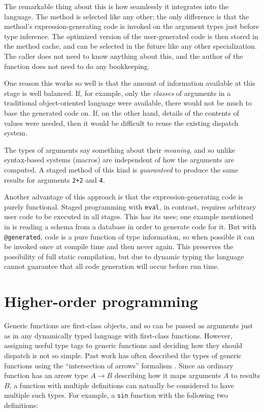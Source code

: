 The remarkable thing about this is how seamlessly it integrates into
the language.
The method is selected like any other; the only difference is that
the method's expression-generating code is invoked on the argument types
just before type inference.
The optimized version of the user-generated code is then stored in the method
cache, and can be selected in the future like any other specialization.
The caller does not need to know anything about this, and the author
of the function does not need to do any bookkeeping.

One reason this works so well is that the amount of information
available at this stage is well balanced.
If, for example, only the \emph{classes} of arguments in a traditional
object-oriented language were available, there would not be much
to base the generated code on.
If, on the other hand, details of the contents of values were needed,
then it would be difficult to reuse the existing dispatch system.

The types of arguments say something about their \emph{meaning},
and so unlike syntax-based systems (macros) are independent of how
the arguments are computed.
A staged method of this kind is \emph{guaranteed} to produce the
same results for arguments \texttt{2+2} and \texttt{4}.

Another advantage of this approach is that the expression-generating
code is purely functional.
Staged programming with \texttt{eval}, in contrast, requires arbitrary
user code to be executed in all stages.
This has its uses; one example mentioned in \cite{DeVito:2014:FRG:2594291.2594307}
is reading a schema from a database in order to generate code for it.
But with \texttt{@generated}, code is a pure function of type information,
so when possible it can be invoked once at compile time and then
never again.
This preserves the possibility of full static compilation, but due to
dynamic typing the language cannot guarantee that all code generation
will occur before run time.


\section{Higher-order programming}

Generic functions are first-class objects, and so can be passed as arguments
just as in any dynamically typed language with first-class functions.
However, assigning useful type tags to generic functions and deciding how
they should dispatch is not so simple.
Past work has often described the types of generic functions using the
``intersection of arrows'' formalism
\cite{RonchiDellaRocca:1988:PTS:55079.55086} \cite{Dunfield:2012:EIU:2364527.2364534}
\cite{boundedquant} \cite{Castagna:1995:COF:203496.203510}.
Since an ordinary function has an arrow type $A\rightarrow B$ describing how it
maps arguments $A$ to results $B$, a function with multiple definitions can
natually be considered to have multiple such types.
For example, a \texttt{sin} function with the following two definitions:

